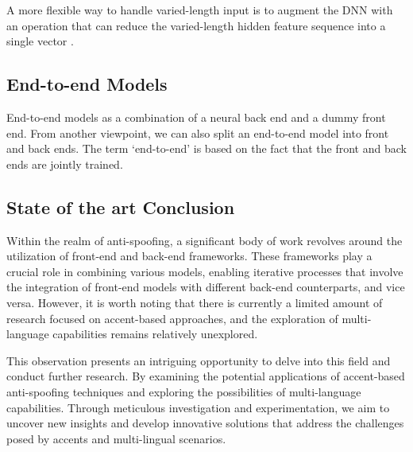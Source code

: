 A more flexible way to handle varied-length input is to augment the DNN with an operation that can reduce the varied-length hidden feature sequence into a single vector \cite{wang2022practical}.

\subsection{End-to-end Models}

End-to-end models as a combination of a neural back end and a dummy front end. From another viewpoint, we can also split an end-to-end model into front and back ends. The term ‘end-to-end’ is based on the fact that the front and back ends are jointly trained\cite{wang2022practical}.

\subsection{State of the art Conclusion}

Within the realm of anti-spoofing, a significant body of work revolves around the utilization of front-end and back-end frameworks. These frameworks play a crucial role in combining various models, enabling iterative processes that involve the integration of front-end models with different back-end counterparts, and vice versa. However, it is worth noting that there is currently a limited amount of research focused on accent-based approaches, and the exploration of multi-language capabilities remains relatively unexplored.

This observation presents an intriguing opportunity to delve into this field and conduct further research. By examining the potential applications of accent-based anti-spoofing techniques and exploring the possibilities of multi-language capabilities. Through meticulous investigation and experimentation, we aim to uncover new insights and develop innovative solutions that address the challenges posed by accents and multi-lingual scenarios.

\endinput
